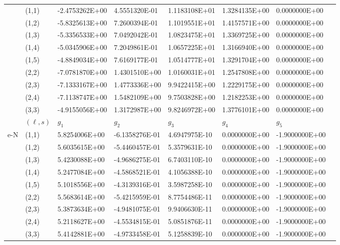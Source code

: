 \documentclass{warpdoc}
\begin{document}
\begin{table}[h]
\begin{center}
\begin{threeparttable}
\begin{tabular*}{\textwidth}{@{\extracolsep{\fill}}llllllll}
\cmidrule(lr{1em}){2-7}											
&	(1,1)	&	-2.4753262E+00	&	4.5551320E-01	&	1.1183108E+01	&	1.3284135E+00	&	0.0000000E+00	\\
&	(1,2)	&	-5.8325613E+00	&	7.2600394E-01	&	1.1019551E+01	&	1.4157571E+00	&	0.0000000E+00	\\
&	(1,3)	&	-5.3356533E+00	&	7.0492042E-01	&	1.0823475E+01	&	1.3369725E+00	&	0.0000000E+00	\\
&	(1,4)	&	-5.0345906E+00	&	7.2049861E-01	&	1.0657225E+01	&	1.3166940E+00	&	0.0000000E+00	\\
&	(1,5)	&	-4.8849034E+00	&	7.6169177E-01	&	1.0514777E+01	&	1.3291704E+00	&	0.0000000E+00	\\
&	(2,2)	&	-7.0781870E+00	&	1.4301510E+00	&	1.0160031E+01	&	1.2547808E+00	&	0.0000000E+00	\\
&	(2,3)	&	-7.1333167E+00	&	1.4773336E+00	&	9.9422415E+00	&	1.2229175E+00	&	0.0000000E+00	\\
&	(2,4)	&	-7.1138747E+00	&	1.5482109E+00	&	9.7503828E+00	&	1.2182253E+00	&	0.0000000E+00	\\
&	(3,3)	&	-4.9155056E+00	&	1.3172987E+00	&	9.8246972E+00	&	1.3776101E+00	&	0.0000000E+00	\\
      \midrule
 & $(\ell,s)$ & $g_1$ & $g_2$ & $g_3$ & $g_4$ & $g_5$ \\
\cmidrule(lr{1em}){2-7}
\multirow{19}{*}{e-N} &	(1,1)	&	5.8254006E+00	&	-6.1358276E-01	&	4.6947975E-10	&	0.0000000E+00	&	-1.9000000E+00	\\
&	(1,2)	&	5.6035615E+00	&	-5.4460457E-01	&	5.3579631E-10	&	0.0000000E+00	&	-1.9000000E+00	\\
&	(1,3)	&	5.4230088E+00	&	-4.9686275E-01	&	6.7403110E-10	&	0.0000000E+00	&	-1.9000000E+00	\\
&	(1,4)	&	5.2477084E+00	&	-4.5868521E-01	&	4.1056388E-10	&	0.0000000E+00	&	-1.9000000E+00	\\
&	(1,5)	&	5.1018556E+00	&	-4.3139316E-01	&	3.5987258E-10	&	0.0000000E+00	&	-1.9000000E+00	\\
&	(2,2)	&	5.5683614E+00	&	-5.4215959E-01	&	8.7754486E-11	&	0.0000000E+00	&	-1.9000000E+00	\\
&	(2,3)	&	5.3873634E+00	&	-4.9481075E-01	&	9.9406630E-11	&	0.0000000E+00	&	-1.9000000E+00	\\
&	(2,4)	&	5.2118627E+00	&	-4.5534815E-01	&	5.0851876E-11	&	0.0000000E+00	&	-1.9000000E+00	\\
&	(3,3)	&	5.4142881E+00	&	-4.9733458E-01	&	5.1258839E-10	&	0.0000000E+00	&	-1.9000000E+00	\\
\cmidrule(lr{1em}){2-7}

\end{tabular*}
\end{threeparttable}
\end{center}
\end{table}
\end{document}
